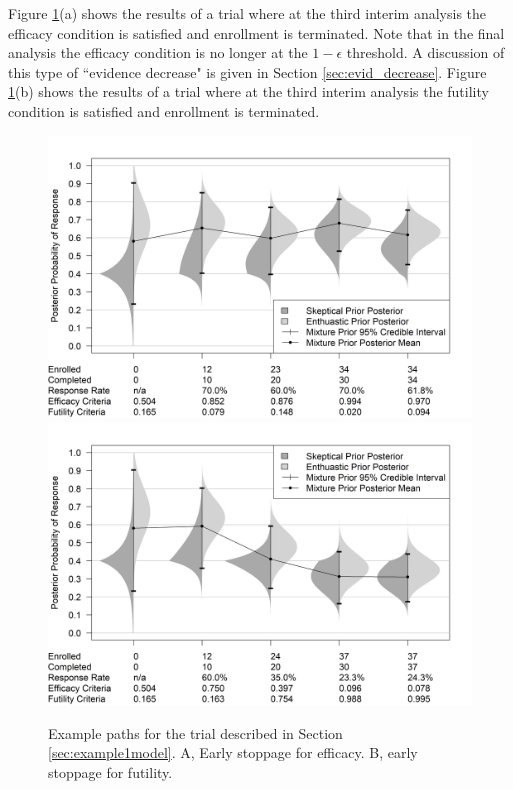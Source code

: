 \documentclass[useAMS,usenatbib,referee]{biom}
\begin{document}
Figure \ref{fig:figure2}(a) shows the results of a trial where at the third interim analysis the efficacy condition is satisfied and enrollment is terminated. Note that in the final analysis the efficacy condition is no longer at the $1-\epsilon$ threshold. A discussion of this type of ``evidence decrease" is given in Section \ref{sec:evid_decrease}.
%
Figure \ref{fig:figure2}(b) shows the results of a trial where at the third interim analysis the futility condition is satisfied and enrollment is terminated. 

\begin{figure}\begin{center}
    \includegraphics[width=6in]{figure2a.png}
    \includegraphics[width=6in]{figure2b.png}
    \caption{Example paths for the trial described in Section \ref{sec:example1model}. A, Early stoppage for efficacy. B, early stoppage for futility.}
	\label{fig:figure2}
\end{center}
\end{figure}
\end{document}
